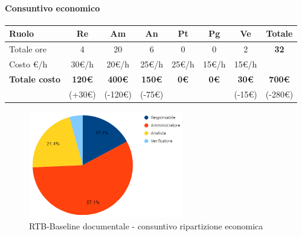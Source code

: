 \paragraph{Consuntivo economico}
\begin{center}
	\renewcommand{\arraystretch}{1.8} %
	\begin{tabular}{ |m{6em}|c|c|c|c|c|c|c| }
	\hline
	\textbf{Ruolo} & \textbf{Re} & \textbf{Am} &  \textbf{An} &  \textbf{Pt} &  \textbf{Pg} &  \textbf{Ve} &  \textbf{Totale}\\
    \hline
    Totale ore & 4 & 20 & 6 & 0 & 0 & 2 & \textbf{32}\\
    \hline
    Costo \euro/h & 30\euro/h & 20\euro/h & 25\euro/h & 25\euro/h & 15\euro/h & 15\euro/h & \\
    \hline
    \textbf{Totale costo} & \textbf{120\euro} & \textbf{400\euro} &  \textbf{150\euro} & \textbf{0\euro} &  \textbf{0\euro} &  \textbf{30\euro} &  \textbf{700\euro} \\
    & (+30\euro) & (-120\euro) & (-75\euro) &  &  & (-15\euro) & (-280\euro) \\
    \hline
	\end{tabular}

    \begin{figure}[H]
       \centering\includegraphics[width=0.6\textwidth, height=0.6\textheight, keepaspectratio]{images/consuntivo/RTB-documentale-costo.png}
       \caption{RTB-Baseline documentale - consuntivo ripartizione economica}
    \end{figure}
\end{center}


